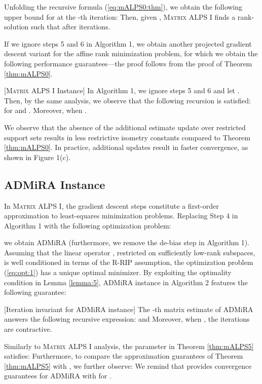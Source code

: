 \documentclass[twocolumn]{svjour3}
\begin{document}
Unfolding the recursive formula (\ref{eq:mALPS0:thm}), we obtain the following upper bound for  at the -th iteration:
 Then, given , \textsc{Matrix ALPS I} finds a rank- solution  such that  after  iterations.

If we ignore steps 5 and 6 in Algorithm 1, we obtain another projected gradient descent variant for the affine rank minimization problem, for which we obtain the following performance guarantees---the proof follows from the proof of Theorem \ref{thm:mALPS0}.

\begin{corollary}{\label{cor:1}}[\textsc{Matrix ALPS I} Instance] 
In Algorithm 1, we ignore steps 5 and 6 and let . Then, by the same analysis, we observe that the following recursion is satisfied:
 for  and . Moreover,  when .
\end{corollary} 

We observe that the absence of the additional estimate update over restricted support sets results in less restrictive isometry constants compared to Theorem \ref{thm:mALPS0}. In practice, additional updates result in faster convergence, as shown in Figure 1(c).

\subsection{ADMiRA Instance}

In \textsc{Matrix ALPS I}, the gradient descent steps constitute a first-order approximation to least-squares minimization problems. Replacing Step 4 in Algorithm 1 with the following optimization problem:

we obtain ADMiRA (furthermore, we remove the de-bias step in Algorithm 1). Assuming that the linear operator , restricted on sufficiently low-rank subspaces, is well conditioned in terms of the R-RIP assumption, the optimization problem (\ref{eq:opt:1}) has a unique optimal minimizer. By exploiting the optimality condition in Lemma \ref{lemma:5}, ADMiRA instance in Algorithm 2 features the following guarantee:

\begin{theorem}\label{thm:mALPS5}[Iteration invariant for ADMiRA instance] The -th matrix estimate  of ADMiRA answers the following recursive expression:
  and   Moreover, when , the iterations are contractive.
\end{theorem}

Similarly to \textsc{Matrix ALPS I} analysis, the parameter  in Theorem \ref{thm:mALPS5} satisfies:
 Furthermore, to compare the approximation guarantees of Theorem \ref{thm:mALPS5} with \cite{admira2010}, we further observe:
 We remind that \cite{admira2010} provides convergence guarantees for ADMiRA with  for .
\end{document}
